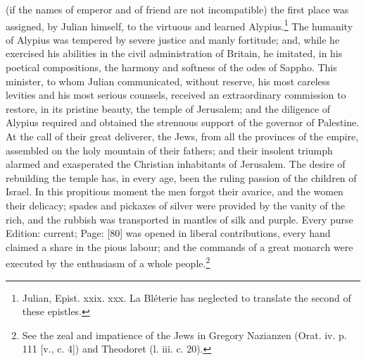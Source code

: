 (if the names of emperor and of friend are not incompatible) the first place was assigned, by Julian himself, to the virtuous and learned Alypius.\footnote{Julian, Epist. xxix. xxx. La Bléterie has neglected to translate the second of these epistles.} The humanity of Alypius was tempered by severe justice and manly fortitude; and, while he exercised his abilities in the civil administration of Britain, he imitated, in his poetical compositions, the harmony and softness of the odes of Sappho. This minister, to whom Julian communicated, without reserve, his most careless levities and his most serious counsels, received an extraordinary commission to restore, in its pristine beauty, the temple of Jerusalem; and the diligence of Alypius required and obtained the strenuous support of the governor of Palestine. At the call of their great deliverer, the Jews, from all the provinces of the empire, assembled on the holy mountain of their fathers; and their insolent triumph alarmed and exasperated the Christian inhabitants of Jerusalem. The desire of rebuilding the temple has, in every age, been the ruling passion of the children of Israel. In this propitious moment the men forgot their avarice, and the women their delicacy; spades and pickaxes of silver were provided by the vanity of the rich, and the rubbish was transported in mantles of silk and purple. Every purse Edition: current; Page: [80] was opened in liberal contributions, every hand claimed a share in the pious labour; and the commands of a great monarch were executed by the enthusiasm of a whole people.\footnote{See the zeal and impatience of the Jews in Gregory Nazianzen (Orat. iv. p. 111 [v., c. 4]) and Theodoret (l. iii. c. 20).}

